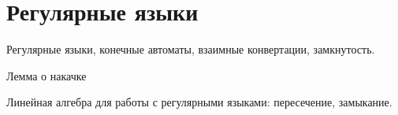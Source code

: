 \chapter{Регулярные языки}

Регулярные языки, конечные автоматы, взаимные конвертации, замкнутость.

Лемма о накачке

Линейная алгебра для работы с регулярными языками: пересечение, замыкание.

%
%
